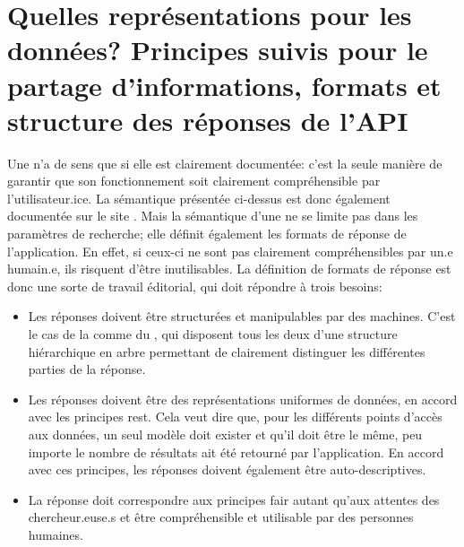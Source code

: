 \section{Quelles représentations pour les données? Principes suivis pour le partage d'informations, formats et structure des réponses de l'API}
Une \api{} n'a de sens que si elle est clairement documentée: c'est la seule manière de garantir que son fonctionnement soit clairement compréhensible par l'utilisateur.ice. La sémantique présentée ci-dessus est donc également documentée sur le site \ktb{}. Mais la sémantique d'une \api{} ne se limite pas dans les paramètres de recherche; elle définit également les formats de réponse de l'application. En effet, si ceux-ci ne sont pas clairement compréhensibles par un.e humain.e, ils risquent d'être inutilisables. La définition de formats de réponse est donc une sorte de travail éditorial, qui doit répondre à trois besoins:

\begin{itemize}
	\item Les réponses doivent être structurées et manipulables par des machines. C'est le cas de la \tei{} comme du \json{}, qui disposent tous les deux d'une structure hiérarchique en arbre permettant de clairement distinguer les différentes parties de la réponse.
	\item Les réponses doivent être des représentations uniformes de données, en accord avec les principes \gls{rest}. Cela veut dire que, pour les différents points d'accès aux données, un seul modèle doit exister et qu'il doit être le même, peu importe le nombre de résultats ait été retourné par l'application. En accord avec ces principes, les réponses doivent également être auto-descriptives.
	\item La réponse doit correspondre aux principes \gls{fair} autant qu'aux attentes des chercheur.euse.s et être compréhensible et utilisable par des personnes humaines. 
\end{itemize}

